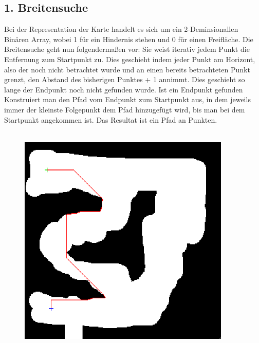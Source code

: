 \subsection*{1. Breitensuche}
	Bei der Representation der Karte handelt es sich um ein 2-Deminsionallen Binären Array, wobei 1 für ein Hindernis stehen und 0 für einen Freifläche. Die Breitensuche geht nun folgendermaßen vor: Sie weist iterativ jedem Punkt die Entfernung zum Startpunkt zu. Dies geschieht indem jeder Punkt am Horizont, also der noch nicht betrachtet wurde und an einen bereits betrachteten Punkt grenzt, den Abstand des bisherigen Punktes + 1 annimmt. Dies geschieht so lange der Endpunkt noch nicht gefunden wurde. Ist ein Endpunkt gefunden Konstruiert man den Pfad vom Endpunkt zum Startpunkt aus, in dem jeweils immer der kleinste Folgepunkt dem Pfad hinzugefügt wird, bis man bei dem Startpunkt angekommen ist. Das Resultat ist ein Pfad an Punkten.\\
	\\

\begin{figure}[ht]
    \centering
	\includegraphics[width=0.9\textwidth, angle=0]{img/p2.png} 
\end{figure}
